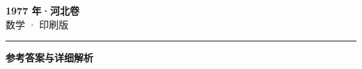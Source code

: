 \documentclass[zihao=5, a4paper]{ctexart}
\begin{document}
\begin{center}
  {\Large\bfseries 1977 年·河北卷}\\[4pt]
  {\large 数学 · 印刷版}
\end{center}
\medskip
{}

\par\bigskip\hrule\bigskip
{}
\begin{center}{\large\bfseries 参考答案与详细解析}\end{center}
\smallskip

\end{document}
